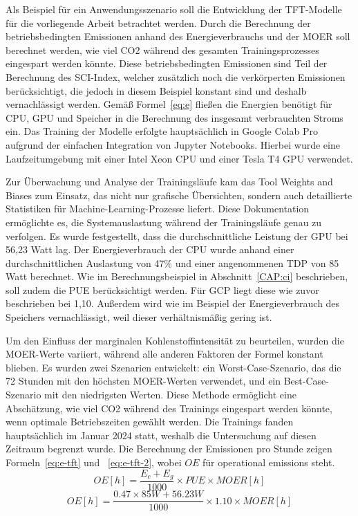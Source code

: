Als Beispiel für ein Anwendungsszenario soll die Entwicklung der \ac{TFT}-Modelle für die vorliegende Arbeit betrachtet werden.
Durch die Berechnung der betriebsbedingten Emissionen anhand des Energieverbrauchs und der \ac{MOER} soll berechnet werden, wie viel \ac{CO2} während des gesamten Trainingsprozesses eingespart werden könnte.
Diese betriebsbedingten Emissionen sind Teil der Berechnung des \ac{SCI}-Index, welcher zusätzlich noch die verkörperten Emissionen berücksichtigt, die jedoch in diesem Beispiel konstant sind und deshalb vernachlässigt werden.
Gemäß Formel~\ref{eq:e} fließen die Energien benötigt für \ac{CPU}, \ac{GPU} und Speicher in die Berechnung des insgesamt verbrauchten Stroms ein.
Das Training der Modelle erfolgte hauptsächlich in Google Colab Pro aufgrund der einfachen Integration von Jupyter Notebooks.
Hierbei wurde eine Laufzeitumgebung mit einer Intel Xeon \ac{CPU} und einer Tesla T4 \ac{GPU} verwendet.

Zur Überwachung und Analyse der Trainingsläufe kam das Tool Weights and Biases zum Einsatz, das nicht nur grafische Übersichten, sondern auch detaillierte Statistiken für Machine-Learning-Prozesse liefert.
Diese Dokumentation ermöglichte es, die Systemauslastung während der Trainingsläufe genau zu verfolgen.
Es wurde festgestellt, dass die durchschnittliche Leistung der \ac{GPU} bei 56,23 Watt lag.
Der Energieverbrauch der \ac{CPU} wurde anhand einer durchschnittlichen Auslastung von 47\% und einer angenommenen \ac{TDP} von 85 Watt berechnet\cite{Intel.20240418}.
Wie im Berechnungsbeispiel in Abschnitt~\ref{CAP:ci} beschrieben, soll zudem die \ac{PUE} berücksichtigt werden.
Für \ac{GCP} liegt diese wie zuvor beschrieben bei 1,10.
Außerdem wird wie im Beispiel der Energieverbrauch des Speichers vernachlässigt, weil dieser verhältnismäßig gering ist.

Um den Einfluss der marginalen Kohlenstoffintensität zu beurteilen, wurden die \ac{MOER}-Werte variiert, während alle anderen Faktoren der Formel konstant blieben.
Es wurden zwei Szenarien entwickelt: ein Worst-Case-Szenario, das die 72 Stunden mit den höchsten \ac{MOER}-Werten verwendet, und ein Best-Case-Szenario mit den niedrigsten Werten.
Diese Methode ermöglicht eine Abschätzung, wie viel \ac{CO2} während des Trainings eingespart werden könnte, wenn optimale Betriebszeiten gewählt werden.
Die Trainings fanden hauptsächlich im Januar 2024 statt, weshalb die Untersuchung auf diesen Zeitraum begrenzt wurde.
Die Berechnung der Emissionen pro Stunde zeigen Formeln~\ref{eq:e-tft} und ~\ref{eq:e-tft-2}, wobei $OE$ für \glqq operational emissions \grqq{} steht.
\begin{equation}
 \label{eq:e-tft}
 OE[h] = \frac{E_c + E_g}{1000} \times PUE \times MOER[h]
\end{equation}
\begin{equation}
 \label{eq:e-tft-2}
 OE[h] = \frac{0.47 \times 85W + 56.23W}{1000} \times 1.10 \times MOER[h]
\end{equation}

